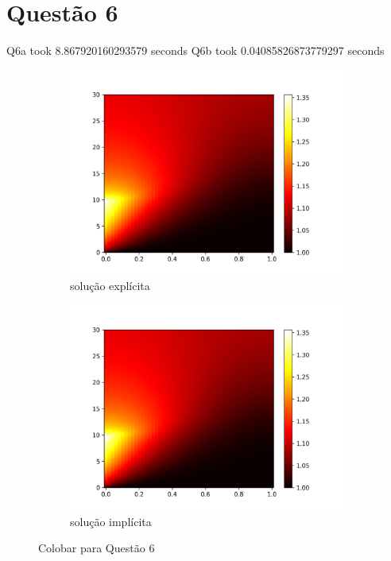 \documentclass{article}
\begin{document}
\section{Questão 6}
Q6a took 8.867920160293579 seconds
Q6b took 0.04085826873779297 seconds
\begin{figure}[h]
\centering
     \begin{subfigure}[b]{0.49\textwidth}
         \centering
         \includegraphics[width=\textwidth]{figs/q6a_colormap.png}
         \caption{ solução explícita}
	\label{fig:q6a_colobar}
     \end{subfigure}
     \hfill
     \begin{subfigure}[b]{0.49\textwidth}
         \centering
         \includegraphics[width=\textwidth]{figs/q6b_colormap.png}
         \caption{solução implícita}
	\label{fig:q6b_colobar}
     \end{subfigure}
\caption{Colobar para Questão 6}
\end{figure}
\end{document}
